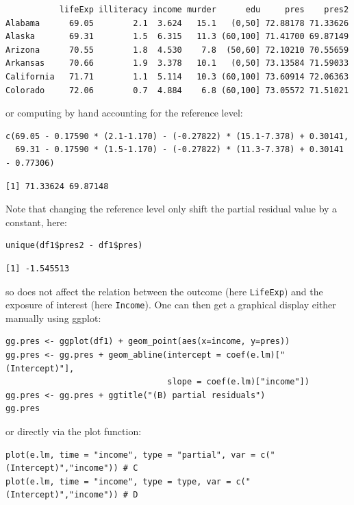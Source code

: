 \documentclass[12pt]{article}
\begin{document}
\begin{verbatim}
           lifeExp illiteracy income murder      edu     pres    pres2
Alabama      69.05        2.1  3.624   15.1   (0,50] 72.88178 71.33626
Alaska       69.31        1.5  6.315   11.3 (60,100] 71.41700 69.87149
Arizona      70.55        1.8  4.530    7.8  (50,60] 72.10210 70.55659
Arkansas     70.66        1.9  3.378   10.1   (0,50] 73.13584 71.59033
California   71.71        1.1  5.114   10.3 (60,100] 73.60914 72.06363
Colorado     72.06        0.7  4.884    6.8 (60,100] 73.05572 71.51021
\end{verbatim}


or computing by hand accounting for the reference level:
\lstset{language=r,label= ,caption= ,captionpos=b,numbers=none}
\begin{lstlisting}
c(69.05 - 0.17590 * (2.1-1.170) - (-0.27822) * (15.1-7.378) + 0.30141,
  69.31 - 0.17590 * (1.5-1.170) - (-0.27822) * (11.3-7.378) + 0.30141 - 0.77306)
\end{lstlisting}

\begin{verbatim}
[1] 71.33624 69.87148
\end{verbatim}


Note that changing the reference level only shift the partial residual
value by a constant, here:
\lstset{language=r,label= ,caption= ,captionpos=b,numbers=none}
\begin{lstlisting}
unique(df1$pres2 - df1$pres)
\end{lstlisting}

\begin{verbatim}
[1] -1.545513
\end{verbatim}


so does not affect the relation between the outcome (here \texttt{LifeExp})
and the exposure of interest (here \texttt{Income}). One can then get a
graphical display either manually using ggplot:
\lstset{language=r,label= ,caption= ,captionpos=b,numbers=none}
\begin{lstlisting}
gg.pres <- ggplot(df1) + geom_point(aes(x=income, y=pres))
gg.pres <- gg.pres + geom_abline(intercept = coef(e.lm)["(Intercept)"],
                                 slope = coef(e.lm)["income"])
gg.pres <- gg.pres + ggtitle("(B) partial residuals")
gg.pres
\end{lstlisting}

or directly via the plot function:
\lstset{language=r,label= ,caption= ,captionpos=b,numbers=none}
\begin{lstlisting}
plot(e.lm, time = "income", type = "partial", var = c("(Intercept)","income")) # C
plot(e.lm, time = "income", type = type, var = c("(Intercept)","income")) # D
\end{lstlisting}
\end{document}
